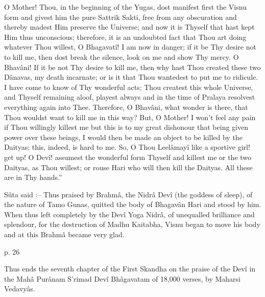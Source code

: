  

O Mother! Thou, in the beginning of the Yugas, dost manifest first the Visnu form and givest him the pure Sattrik Sakti, free from any obscuration and thereby madest Him preserve the Universe; and now it is Thyself that hast kept Him thus unconscious; therefore, it is an undoubted fact that Thou art doing whatever Thou willest, O Bhagavatî! I am now in danger; if it be Thy desire not to kill me, then dost break the silence, look on me and show Thy mercy. O Bhavâni! If it be not Thy desire to kill me, then why hast Thou created these two Dânavas, my death incarnate; or is it that Thou wantedest to put me to ridicule. I have come to know of Thy wonderful acts; Thou createst this whole Universe, and Thyself remaining aloof, playest always and in the time of Pralaya resolvest everything again into Thee. Therefore, O Bhavâni, what wonder is there, that Thou wouldst want to kill me in this way? But, O Mother! I won't feel any pain if Thou willingly killest me but this is to my great dishonour that being given power over these beings, I would then be made an object to be killed by the Daityas; this, indeed, is hard to me. So, O Thou Leelâmayî like a sportive girl! get up! O Devî! assumest the wonderful form Thyself and killest me or the two Daityas, as Thou willest; or rouse Hari who will then kill the Daityas. All these are in Thy hands.”

 

Sûta said :-- Thus praised by Brahmâ, the Nidrâ Devî (the goddess of sleep), of the nature of Tamo Gunas, quitted the body of Bhagavân Hari and stood by him. When thus left completely by the Devî Yoga Nidrâ, of unequalled brilliance and splendour, for the destruction of Madhu Kaitabha, Visnu began to move his body and at this Brahmâ became very glad.

 

p. 26

 

Thus ends the seventh chapter of the First Skandha on the praise of the Devî in the Mahâ Purânam S’rimad Devî Bhâgavatam of 18,000 verses, by Maharsi Vedavyâs.